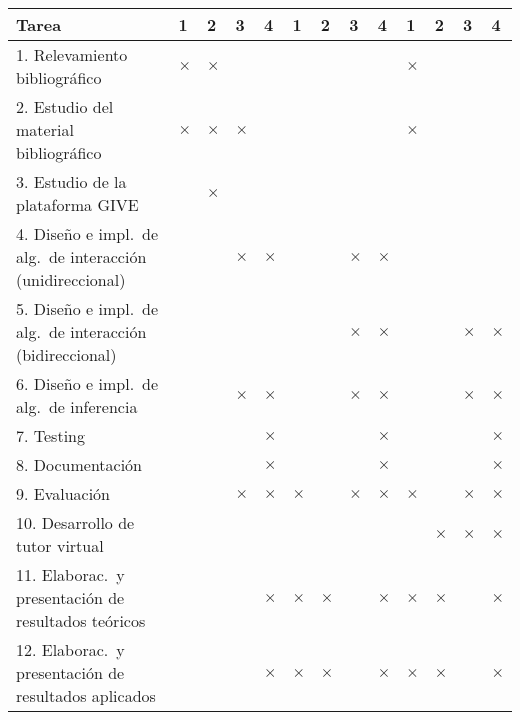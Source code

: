 {\footnotesize
\begin{center}
\begin{tabular}{|p{7cm}||p{2mm}|p{2mm}|p{2mm}|p{2mm}||p{2mm}|p{2mm}|p{2mm}|p{2mm
}||p{2mm}|p{2mm}|p{2mm}|p{2mm}||}
\hline
 \rowcolor[rgb]{0.8,0.8,0.8}\hspace{3.5cm}Tarea & 1 & 2 & 3 & 4 & 1 & 2 & 3 & 4
& 1 & 2 & 3 & 4\\
\hline 1. Relevamiento bibliogr\'afico
& $\times$ & $\times$ &&&&&&&$\times$&&&\\
\hline 2. Estudio del material bibliogr\'afico
& $\times$ & $\times$ & $\times$ &  &&&&&$\times$&&&\\
\hline 3. Estudio de la plataforma GIVE
& & $\times$ & &&&&&&&&&\\
\hline 4. Dise\~no e impl.\ de alg.\ de interacci\'on (unidireccional)
& & & $\times$ & $\times$&&&$\times$&$\times$&&&&\\
\hline 5. Dise\~no e impl.\ de alg.\ de interacci\'on (bidireccional)
& & &  & &&&$\times$&$\times$&&&$\times$&$\times$\\
\hline 6. Dise\~no e impl.\ de alg.\ de inferencia
& & & $\times$ & $\times$&&&$\times$&$\times$&&&$\times$&$\times$\\
\hline 7. Testing
&&&&$\times$&&&&$\times$&&&&$\times$\\
\hline 8. Documentaci\'on
&&&&$\times$&&&&$\times$&&&&$\times$\\
\hline 9. Evaluaci\'on
&&&$\times$&$\times$&$\times$&&$\times$&$\times$&$\times$&&$\times$&$\times$\\
\hline 10. Desarrollo de tutor virtual
&&&&&&&&&&$\times$&$\times$&$\times$\\
\hline 11. Elaborac.\ y presentaci\'on de resultados te\'oricos
&&&&$\times$&$\times$&$\times$&&$\times$&$\times$&$\times$&&$\times$\\
\hline 12. Elaborac.\ y presentaci\'on de resultados aplicados
&&&&$\times$&$\times$&$\times$&&$\times$&$\times$&$\times$&&$\times$\\\hline
\end{tabular}\end{center}
}


